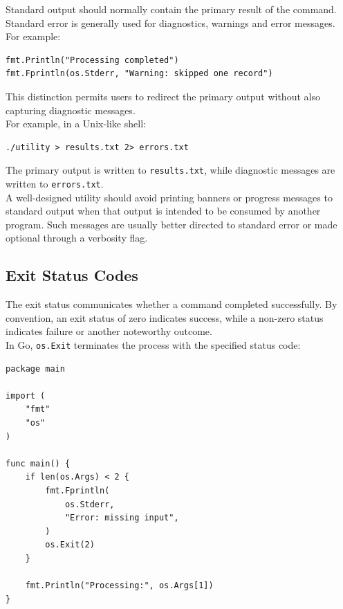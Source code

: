 Standard output should normally contain the primary result of the command. Standard error is generally used for diagnostics, warnings and error messages.\\

For example:

\begin{lstlisting}
fmt.Println("Processing completed")
fmt.Fprintln(os.Stderr, "Warning: skipped one record")
\end{lstlisting}

This distinction permits users to redirect the primary output without also capturing diagnostic messages.\\

For example, in a Unix-like shell:

\begin{lstlisting}
./utility > results.txt 2> errors.txt
\end{lstlisting}

The primary output is written to \texttt{results.txt}, while diagnostic messages are written to \texttt{errors.txt}.\\

A well-designed utility should avoid printing banners or progress messages to standard output when that output is intended to be consumed by another program. Such messages are usually better directed to standard error or made optional through a verbosity flag.

\subsection{Exit Status Codes}

The exit status communicates whether a command completed successfully. By convention, an exit status of zero indicates success, while a non-zero status indicates failure or another noteworthy outcome.\\

In Go, \texttt{os.Exit} terminates the process with the specified status code:

\begin{lstlisting}
package main

import (
    "fmt"
    "os"
)

func main() {
    if len(os.Args) < 2 {
        fmt.Fprintln(
            os.Stderr,
            "Error: missing input",
        )
        os.Exit(2)
    }

    fmt.Println("Processing:", os.Args[1])
}
\end{lstlisting}

